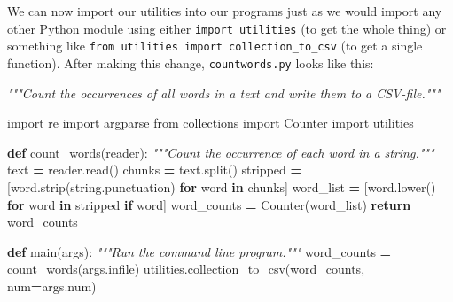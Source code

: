 \documentclass[
]{krantz}
\makeatletter
\newenvironment{Shaded}{\begin{snugshade}}{\end{snugshade}}
\newcommand{\CommentTok}[1]{\textcolor[rgb]{0.56,0.35,0.01}{\textit{#1}}}
\newcommand{\ControlFlowTok}[1]{\textcolor[rgb]{0.13,0.29,0.53}{\textbf{#1}}}
\newcommand{\ImportTok}[1]{#1}
\newcommand{\KeywordTok}[1]{\textcolor[rgb]{0.13,0.29,0.53}{\textbf{#1}}}
\newcommand{\NormalTok}[1]{#1}
\newcommand{\OperatorTok}[1]{\textcolor[rgb]{0.81,0.36,0.00}{\textbf{#1}}}
\newenvironment{kframe}{%
\medskip{}
\setlength{\fboxsep}{.8em}
 \def\at@end@of@kframe{}%
 \ifinner\ifhmode%
  \def\at@end@of@kframe{\end{minipage}}%
  \begin{minipage}{\columnwidth}%
 \fi\fi%
 \def\FrameCommand##1{\hskip\@totalleftmargin \hskip-\fboxsep
 \colorbox{shadecolor}{##1}\hskip-\fboxsep
     \hskip-\linewidth \hskip-\@totalleftmargin \hskip\columnwidth}%
 \MakeFramed {\advance\hsize-\width
   \@totalleftmargin\z@ \linewidth\hsize
   \@setminipage}}%
 {\par\unskip\endMakeFramed%
 \at@end@of@kframe}
\renewenvironment{Shaded}{\begin{kframe}}{\end{kframe}}
\makeatother
\begin{document}
We can now import our utilities into our programs
just as we would import any other Python module
using either \texttt{import\ utilities} (to get the whole thing)
or something like \texttt{from\ utilities\ import\ collection\_to\_csv} (to get a single function).
After making this change,
\texttt{countwords.py} looks like this:

\begin{Shaded}
\begin{Highlighting}[]
\CommentTok{"""Count the occurrences of all words in a text and write them to a CSV{-}file."""}

\ImportTok{import}\NormalTok{ re}
\ImportTok{import}\NormalTok{ argparse}
\ImportTok{from}\NormalTok{ collections }\ImportTok{import}\NormalTok{ Counter}
\ImportTok{import}\NormalTok{ utilities}


\KeywordTok{def}\NormalTok{ count\_words(reader):}
    \CommentTok{"""Count the occurrence of each word in a string."""}
\NormalTok{    text }\OperatorTok{=}\NormalTok{ reader.read()}
\NormalTok{    chunks }\OperatorTok{=}\NormalTok{ text.split()}
\NormalTok{    stripped }\OperatorTok{=}\NormalTok{ [word.strip(string.punctuation) }\ControlFlowTok{for}\NormalTok{ word }\KeywordTok{in}\NormalTok{ chunks]}
\NormalTok{    word\_list }\OperatorTok{=}\NormalTok{ [word.lower() }\ControlFlowTok{for}\NormalTok{ word }\KeywordTok{in}\NormalTok{ stripped }\ControlFlowTok{if}\NormalTok{ word]}
\NormalTok{    word\_counts }\OperatorTok{=}\NormalTok{ Counter(word\_list)}
    \ControlFlowTok{return}\NormalTok{ word\_counts}


\KeywordTok{def}\NormalTok{ main(args):}
    \CommentTok{"""Run the command line program."""}
\NormalTok{    word\_counts }\OperatorTok{=}\NormalTok{ count\_words(args.infile)}
\NormalTok{    utilities.collection\_to\_csv(word\_counts, num}\OperatorTok{=}\NormalTok{args.num)}



\end{Highlighting}
\end{Shaded}
\end{document}
